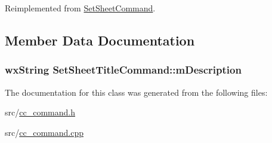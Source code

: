 Reimplemented from \hyperlink{a00134_a027700275d409b94185dfb3aa2d792bb}{Set\-Sheet\-Command}.



\subsection{Member Data Documentation}
\hypertarget{a00135_a1dfaa858067eba21fe735b5420146cfb}{
\subsubsection[{m\-Description}]{\setlength{\rightskip}{0pt plus 5cm}wx\-String Set\-Sheet\-Title\-Command\-::m\-Description\hspace{0.3cm}{\ttfamily [protected]}}}\label{a00135_a1dfaa858067eba21fe735b5420146cfb}


The documentation for this class was generated from the following files\-:\begin{DoxyCompactItemize}
\item 
src/\hyperlink{a00183}{cc\-\_\-command.\-h}\item 
src/\hyperlink{a00182}{cc\-\_\-command.\-cpp}\end{DoxyCompactItemize}

